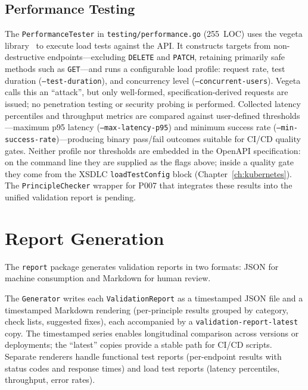 \subsection{Performance Testing}
\label{subsec:performance-testing}

The \texttt{PerformanceTester} in \texttt{testing/performance.go} (255~LOC) uses the vegeta library~\cite{vegeta} to execute load tests against the API. It constructs targets from non-destructive endpoints---excluding \texttt{DELETE} and \texttt{PATCH}, retaining primarily safe methods such as \texttt{GET}---and runs a configurable load profile: request rate, test duration (\texttt{--test-duration}), and concurrency level (\texttt{--concurrent-users}). Vegeta calls this an ``attack'', but only well-formed, specification-derived requests are issued; no penetration testing or security probing is performed. Collected latency percentiles and throughput metrics are compared against user-defined thresholds---maximum p95 latency (\texttt{--max-latency-p95}) and minimum success rate (\texttt{--min-success-rate})---producing binary pass/fail outcomes suitable for CI/CD quality gates. Neither profile nor thresholds are embedded in the OpenAPI specification: on the command line they are supplied as the flags above; inside a quality gate they come from the XSDLC \texttt{loadTestConfig} block (Chapter~\ref{ch:kubernetes}). The \texttt{PrincipleChecker} wrapper for P007 that integrates these results into the unified validation report is pending.

\section{Report Generation}
\label{sec:report-generation}

The \texttt{report} package generates validation reports in two formats: JSON for machine consumption and Markdown for human review.

The \texttt{Generator} writes each \texttt{ValidationReport} as a timestamped JSON file and a timestamped Markdown rendering (per-principle results grouped by category, check lists, suggested fixes), each accompanied by a \texttt{validation-report-latest} copy. The timestamped series enables longitudinal comparison across versions or deployments; the ``latest'' copies provide a stable path for CI/CD scripts. Separate renderers handle functional test reports (per-endpoint results with status codes and response times) and load test reports (latency percentiles, throughput, error rates).

